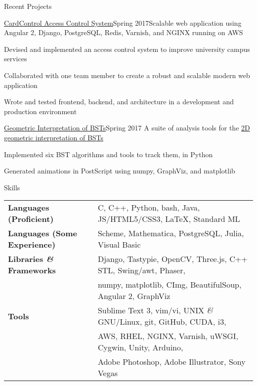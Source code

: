 \documentclass{resume}
\begin{document}
  \begin{rSection}{Recent Projects}
    \begin{rSubsection}{\href{https://github.com/CaerusKaru/cardcontrol}{CardControl Access Control System}}{Spring 2017}{Scalable web application using Angular 2, Django, PostgreSQL, Redis, Varnish, and NGINX running on AWS}{}
    \item Devised and implemented an access control system to improve university campus services
    \item Collaborated with one team member to create a robust and scalable modern web application
    \item Wrote and tested frontend, backend, and architecture in a development and production environment
    \end{rSubsection}
    
    \begin{rSubsection}{\href{https://github.com/forsooth/BST-analysis}{Geometric Interpretation of BSTs}}{Spring 2017}
    {A suite of analysis tools for the \href{https://en.wikipedia.org/wiki/Geometry_of_binary_search_trees}{2D geometric interpretation of BSTs}} {}
    \item Implemented six BST algorithms and tools to track them, in Python
    \item Generated animations in PostScript using numpy, GraphViz, and matplotlib
    \end{rSubsection}
  
  \end{rSection}
  
  \begin{rSection}{Skills}
    \begin{tabular}{ @{} >{\bfseries}l @{\hspace{6ex}} l }
      Languages (Proficient)& C, C++, Python, bash, Java, JS/HTML5/CSS3, \LaTeX, Standard ML\\
      Languages (Some Experience)& Scheme, Mathematica, PostgreSQL, Julia, Visual Basic\\
      Libraries \textit{\&} Frameworks & Django, Tastypie, OpenCV, Three.js, C++ STL, Swing/awt, Phaser,\\
      & numpy, matplotlib, CImg, BeautifulSoup, Angular 2, GraphViz\\
      Tools & Sublime Text 3, vim/vi, UNIX \textit{\&} GNU/Linux, git, GitHub, CUDA, i3,\\
      & AWS, RHEL, NGINX, Varnish, uWSGI, Cygwin, Unity, Arduino,\\
      & Adobe Photoshop, Adobe Illustrator, Sony Vegas
    \end{tabular}
  \end{rSection}
\end{document}
